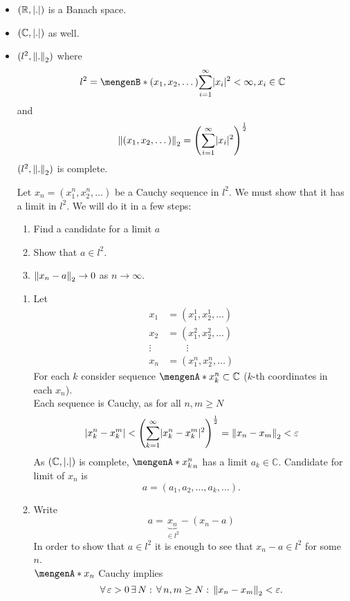 \begin{beispiele}
	\begin{itemize}
		\item $(\mathbb{R},\lvert.\rvert)$ is a Banach space.
		\item $(\mathbb{C},\lvert.\rvert)$ as well.
		\item $(l^2,\norm{.}_2)$ where
		\[
			l^2= \set[(x_1,x_2,\dots)]{\sum^{\infty}_{i=1} \abs{x_i}^2 < \infty, x_i \in \mathbb{C}}
		\]
		and 
		\[
			\norm{(x_1,x_2,\dots)}_2 = \left( \sum_{i=1}^{\infty} \abs{x_i}^2 \right)^{\frac{1}{2}}
		\]
		$(l^2,\norm{.}_2)$ is complete.
		\begin{beweis}
			Let $x_n = (x_1^n,x_2^n,\dots)$ be a Cauchy sequence in $l^2$. We must show that it has a limit in $l^2$. We will do it in a few steps:
			\begin{enumerate}[Step 1:]
				\item Find a candidate for a limit $a$
				\item Show that $a \in l^2$.
				\item $\norm{x_n - a }_2 \to 0$ as $n \to \infty$.
			\end{enumerate}
			\begin{enumerate}[Step 1:]
				\item Let
				\begin{align*}
					x_1 &= (x_1^1,x_2^1, \dots) \\
					x_2 &= (x_1^2,x_2^2, \dots) \\
					\vdots & \qquad \vdots \\
					x_n &= (x_1^n,x_2^n, \dots)
				\end{align*}
				For each $k$ consider sequence $\set{x_k^n} \subset \mathbb{C}$ ($k$-th coordinates in each $x_n$). \\
				Each sequence is Cauchy, as for all $n,m \geq N$
				\[
					\abs{x_k^n-x_k^m} < \left( \sum_{k=1}^{\infty} \abs{x_k^n-x_k^m}^2 \right)^{\frac{1}{2}} = \norm{x_n-x_m}_2 < \varepsilon
				\]
				As $(\mathbb{C}, \lvert.\rvert)$ is complete, $\set{x_k^n}_n$ has a limit $a_k \in \mathbb{C}$. Candidate for limit of $x_n$ is 
				\[
					a= (a_1,a_2, \dots, a_k, \dots).
				\]
				\item Write 
				\[
					a = \underset{\in l^2}{\underbrace{x_n}} - (x_n - a)
				\]
				In order to show that $a \in l^2$ it is enough to see that $x_n - a \in l^2$ for some $n$. \\
				$\set{x_n}$ Cauchy implies
				\[
					\forall\, \varepsilon>0 \,\exists\,N: \,\forall\, n,m \geq N: \,\norm{x_n-x_m}_2 < \varepsilon.
\]
\end{enumerate}
\end{beweis}
\end{itemize}
\end{beispiele}
